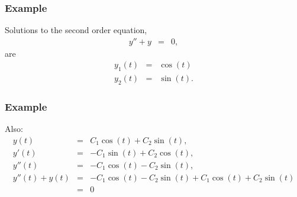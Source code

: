 \begin{frame}
  \frametitle{Example}

  Solutions to the second order equation,
  \begin{eqnarray*}
    y'' + y & = & 0,
  \end{eqnarray*}
  are
  \begin{eqnarray*}
    y_1(t) & = & \cos(t) \\
    y_2(t) & = & \sin(t).
  \end{eqnarray*}


\end{frame}

\begin{frame}
  \frametitle{Example}

  Also:
  \begin{eqnarray*}
    y(t) & = & C_1 \cos(t) + C_2 \sin(t), \\
    y'(t) & = & -C_1 \sin(t) + C_2 \cos(t), \\
    y''(t) & = & -C_1 \cos(t) - C_2 \sin(t), \\
    y''(t) + y(t) & = & -C_1 \cos(t) - C_2 \sin(t) + C_1 \cos(t) + C_2 \sin(t) \\
    & = & 0
  \end{eqnarray*}


\end{frame}


